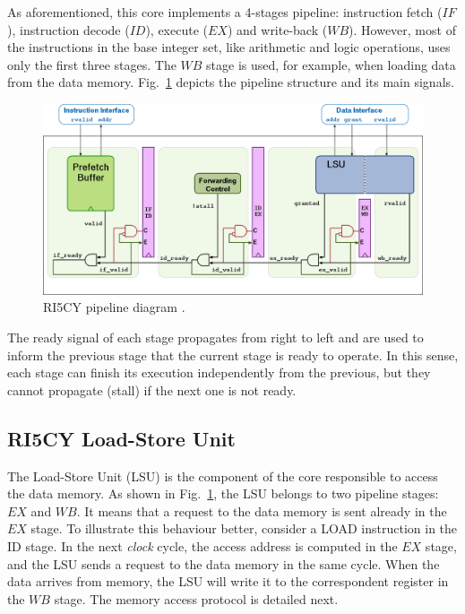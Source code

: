 As aforementioned, this core implements a 4-stages pipeline: instruction fetch ($IF$), instruction decode ($ID$), execute ($EX$) and write-back ($WB$). However, most of the instructions in the base integer set, like arithmetic and logic operations, uses only the first three stages. The $WB$ stage is used, for example, when loading data from the data memory. Fig.~\ref{fig:ri5cy_pipeline} depicts the pipeline structure and its main signals.

\begin{figure}[htb!]
	\centering
	\includegraphics[width=\textwidth]{images/ri5cy_pipeline.png}
	\caption{RI5CY pipeline diagram \cite{manual-ri5cy}.}
	\label{fig:ri5cy_pipeline}
\end{figure}

The ready signal of each stage propagates from right to left and are used to inform the previous stage that the current stage is ready to operate. In this sense, each stage can finish its execution independently from the previous, but they cannot propagate (stall) if the next one is not ready. 

\subsection*{RI5CY Load-Store Unit}

The Load-Store Unit (LSU) is the component of the core responsible to access the data memory. As shown in Fig.~\ref{fig:ri5cy_pipeline}, the LSU belongs to two pipeline stages: $EX$ and $WB$. It means that a request to the data memory is sent already in the $EX$ stage. To illustrate this behaviour better, consider a LOAD instruction in the ID stage. In the next \textit{clock} cycle, the access address is computed in the $EX$ stage, and the LSU sends a request to the data memory in the same cycle. When the data arrives from memory, the LSU will write it to the correspondent register in the $WB$ stage. The memory access protocol is detailed next.

